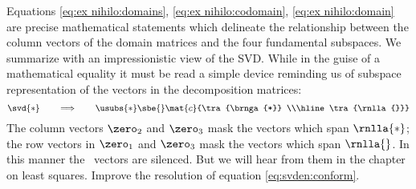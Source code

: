 Equations \eqref{eq:ex nihilo:domains}, \eqref{eq:ex nihilo:codomain}, \eqref{eq:ex nihilo:domain} are precise mathematical statements which delineate the relationship between the column vectors of the domain matrices and the four fundamental subspaces. We summarize with an impressionistic view of the SVD. While in the guise of a mathematical equality it must be read a simple device reminding us of subspace representation of the vectors in the decomposition matrices:
\begin{equation}
  \svd{*} \qquad \Longrightarrow \qquad 
    \usubs{*}
    \sbe{}
    \mat{c}{\tra{\brnga{*}} \\\hline \tra{\rnlla{}}}
\end{equation}
The column vectors $\zero_{2}$ and $\zero_{3}$ mask the vectors which span $\rnlla{*}$; the row vectors in $\zero_{1}$ and $\zero_{3}$ mask the vectors which span $\rnlla{}$. In this manner the \ns \ vectors are silenced. But we will hear from them in the chapter on least squares.
%
Improve the resolution of equation \eqref{eq:svden:conform}.



\endinput